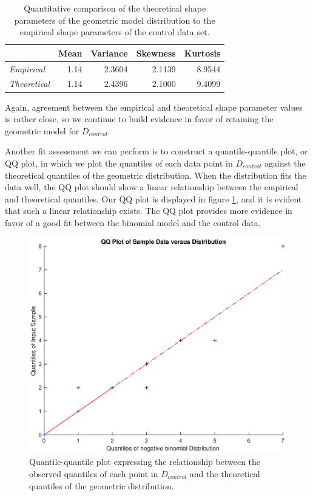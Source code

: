 \documentclass{amsart}
\begin{document}
\begin{table}
\begin{tabular}{lrrrr}
\toprule
			&	{\bf Mean}	&	{\bf Variance}	&	{\bf Skewness}	&	{\bf Kurtosis}\\\midrule
{\sl Empirical}	&	1.14 	&	2.3604	&	2.1139	&	8.9544\\ 
{\sl Theoretical}&	1.14    & 	2.4396	&	2.1000		&	9.4099\\
\bottomrule
\end{tabular}
 \caption{Quantitative comparison of the theoretical shape parameters of the geometric model distribution to the empirical shape parameters of the control data set.\label{Tbl:quantitativeAssessment}}
\end{table}

Again, agreement between the empirical and theoretical shape parameter values is rather close, so we continue to build evidence in favor of retaining the geometric model for $D_{control}$.

Another fit assessment we can perform is to construct a quantile-quantile plot, or QQ plot, in which we plot the quantiles of each data point in $D_{control}$ against the theoretical quantiles of the geometric distribution. When the distribution fits the data well, the QQ plot should show a linear relationship between the empirical and theoretical quantiles. Our QQ plot is displayed in figure \ref{F:qqplot}, and it is evident that such a linear relationship exists. The QQ plot provides more evidence in favor of a good fit between the binomial model and the control data.
\begin{figure}
\centering
\includegraphics[scale=0.55]{qqplotfinal}
\caption{
Quantile-quantile plot expressing the relationship between the observed quantiles of each point in $D_{control}$ and the theoretical quantiles of the geometric distribution.\label{F:qqplot}}
\end{figure}
\end{document}
